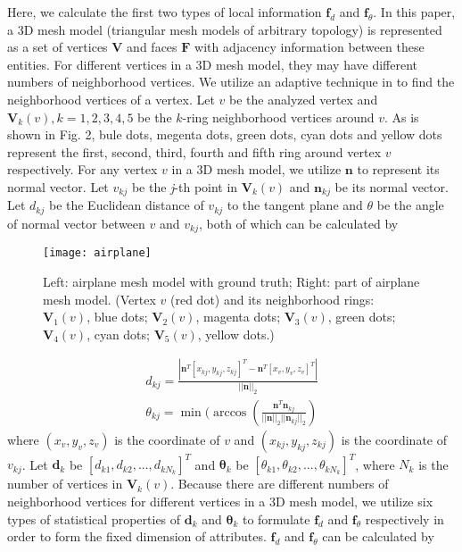 \documentclass[runningheads]{article}
\begin{document}
Here, we calculate the first two types of local information \emph{$\bm{f}_d$} and \emph{$\bm{f}_\theta$}. In this paper, a 3D mesh model (triangular mesh models of arbitrary topology) is represented as a set of vertices \emph{$\bm{V}$} and faces \emph{$\bm{F}$} with adjacency information between these entities. For different vertices in a 3D mesh model, they may have different numbers of neighborhood vertices. We utilize an adaptive technique in \cite{3Dharris2011harris} to find the neighborhood vertices of a vertex. Let \emph{$v$} be the analyzed vertex and \emph{$\bm{V}_k(v),k=1,2,3,4,5$} be the \emph{$k$}-ring neighborhood vertices around \emph{$v$}. As is shown in Fig. 2, bule dots, megenta dots, green dots, cyan dots and yellow dots represent the first, second, third, fourth and fifth ring around vertex \emph{$v$} respectively.  For any vertex \emph{$v$} in a 3D mesh model, we utilize \emph{$\bm{n}$} to represent its normal vector. Let \emph{$v_{kj}$} be the \emph{j}-th point in \emph{$\bm{V}_k(v)$} and \emph{$\bm{n}_{kj}$} be its normal vector. Let \emph{$d_{kj}$} be the Euclidean distance of \emph{$v_{kj}$} to the tangent plane and \emph{$\theta$} be the angle of normal vector between \emph{$v$} and \emph{$v_{kj}$}, both of which can be calculated by
\begin{figure}[tbp]
	\centering
	\begin{minipage}[b]{1\linewidth}
		\texttt{[image: airplane]}
		\caption{Left: airplane mesh model with ground truth; Right: part of airplane mesh model. (Vertex \emph{$v$} (red dot) and its neighborhood rings: \emph{$\bm{V}_1(v)$}, blue dots; \emph{$\bm{V}_2(v)$}, magenta dots; \emph{$\bm{V}_3(v)$}, green dots; \emph{$\bm{V}_4(v)$}, cyan dots; \emph{$\bm{V}_5(v)$}, yellow dots.)}
	\end{minipage}
\end{figure}
\begin{gather}
	d_{kj} = \frac{|\bm{n}^T[x_{kj},y_{kj},z_{kj}]^T-\bm{n}^T[x_v,y_v,z_v]^T|}{|| \bm{n} ||_2}\\
	\theta_{kj}= \min(\arccos(\frac{\bm{n}^T\bm{n}_{kj}}{||\bm{n}||_2||\bm{n}_{kj}||_2})
\end{gather}
where \emph{$(x_v,y_v,z_v)$} is the coordinate of \emph{$v$} and \emph{$(x_{kj},y_{kj},z_{kj})$} is the coordinate of \emph{$v_{kj}$}. Let \emph{$\bm{d}_k$} be \emph{$[d_{k1},d_{k2},...,d_{kN_k}]^T$} and \emph{$\bm{\theta}_k$} be \emph{$[\theta_{k1},\theta_{k2},...,\theta_{kN_k}]^T$}, where \emph{$N_k$} is the number of vertices in \emph{$\bm{V}_k(v)$}. Because there are different numbers of neighborhood vertices for different vertices in a 3D mesh model, we utilize six types of statistical properties of \emph{$\bm{d}_k$} and \emph{$\bm{\theta}_k$} to formulate \emph{$\bm{f}_d$} and \emph{$\bm{f}_\theta$} respectively in order to form the fixed dimension of attributes. \emph{$\bm{f}_d$} and \emph{$\bm{f}_\theta$} can be calculated by
\end{document}
